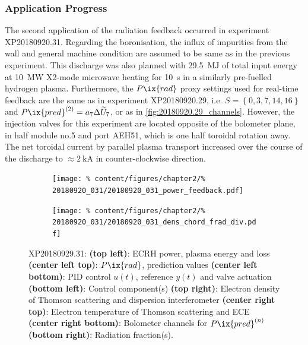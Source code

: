         \subsubsection*{Application Progress}%
%
            The second application of the radiation feedback occurred in experiment XP20180920.31. Regarding the boronisation, the influx of impurities from the wall and general machine condition are assumed to be same as in the previous experiment. This discharge was also planned with \SI{29.5}{\mega\joule} of total input energy at \SI{10}{\mega\watt} X2-mode microwave heating for \SI{10}{\second} in a similarly pre-fuelled hydrogen plasma. Furthermore, the $P\ix{rad}$ proxy settings used for real-time feedback are the same as in experiment XP20180920.29, i.e. $S=\left\{0, 3, 7, 14, 16\right\}$ and $P\ix{pred}^{\left(2\right)}=a_{7}\Delta\widetilde{U}_{7}$, or as in \cref{fig:20180920.29_channels}. However, the injection valves for this experiment are located opposite of the bolometer plane, in half module no.5 and port AEH51, which is one half toroidal rotation away. The net toroidal current by parallel plasma transport increased over the course of the discharge to $\approx\SI{2}{\kilo\ampere}$ in counter-clockwise direction.\\%
%
            \begin{figure}[t]%
                \centering%
                \begin{subfigure}{.48\textwidth}%
                    \centering%
                    \texttt{[image: \%
                        content/figures/chapter2/\%
                        20180920\_031/20180920\_031\_power\_feedback.pdf]}%
                \end{subfigure}%
                \hspace*{0.2cm}%
                \begin{subfigure}{.48\textwidth}%
                    \centering%
                    \texttt{[image: \%
                        content/figures/chapter2/\%
                        20180920\_031/20180920\_031\_dens\_chord\_frad\_div.pdf]}%
                \end{subfigure}%
                \caption{%
                    XP20180929.31: %
                    \textbf{(top left)}: ECRH power, plasma energy and loss \textbf{(center left top)}: $P\ix{rad}$, prediction values \textbf{(center left bottom)}: PID control $u\left(t\right)$, reference $y\left(t\right)$ and valve actuation \textbf{(bottom left)}: Control component(s) \textbf{(top right)}: Electron density of Thomson scattering and dispersion interferometer \textbf{(center right top)}: Electron temperature of Thomson scattering and ECE \textbf{(center right bottom)}: Bolometer channels for $P\ix{pred}^{\left(n\right)}$ \textbf{(bottom right)}: Radiation fraction(s).}\label{fig:20180920.31_PDF}%
            \end{figure}%
